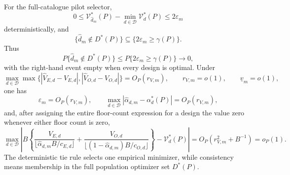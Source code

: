 For the full-catalogue pilot selector,
\[
0\le\mathcal V_{\widehat d_m}^*(P)-\min_{d\in\mathcal D}\mathcal V_d^*(P)
\le2\varepsilon_m
\]
deterministically, and
\[
\{\widehat d_m\notin D^*(P)\}
\subseteq\{2\varepsilon_m\ge\gamma(P)\}.
\]
Thus
\[
P\{\widehat d_m\notin D^*(P)\}
\le P\{2\varepsilon_m\ge\gamma(P)\}\longrightarrow0,
\]
with the right-hand event empty when every design is optimal. Under
\[
\max_{d\in\mathcal D}\max\{|\widehat V_{E,d}-V_{E,d}|,
|\widehat V_{O,d}-V_{O,d}|\}=O_P(r_{V,m}),
\qquad r_{V,m}=o(1),
\qquad \underline v_m=o(1),
\]
one has
\[
\varepsilon_m=O_P(r_{V,m}),
\qquad
\max_{d\in\mathcal D}|\widehat\alpha_{d,m}-\alpha_d^*(P)|
=O_P(r_{V,m}),
\]
and, after assigning the entire floor-count expression for a design the value zero whenever either floor count is zero,
\[
\max_{d\in\mathcal D}\left|B\left\{
\frac{V_{E,d}}{\lfloor\widehat\alpha_{d,m}B/c_{E,d}\rfloor}
+\frac{V_{O,d}}{\lfloor(1-\widehat\alpha_{d,m})B/c_{O,d}\rfloor}
\right\}-\mathcal V_d^*(P)\right|
=O_P(r_{V,m}^2+B^{-1})=o_P(1).
\]
The deterministic tie rule selects one empirical minimizer, while consistency means membership in the full population optimizer set \(D^*(P)\).